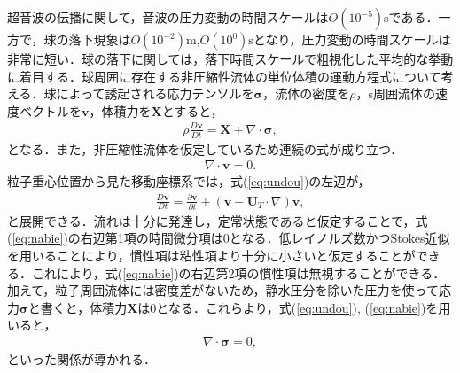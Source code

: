 超音波の伝播に関して，音波の圧力変動の時間スケールは$O\left(10^{-5}\right)$sである．一方で，球の落下現象は$O\left(10^{-2}\right)$m,$O\left(10^{0}\right)$sとなり，圧力変動の時間スケールは非常に短い．球の落下に関しては，落下時間スケールで粗視化した平均的な挙動に着目する．球周囲に存在する非圧縮性流体の単位体積の運動方程式について考える．球によって誘起される応力テンソルを$\bm{\sigma}$，流体の密度を$\rho$，s周囲流体の速度ベクトルを$\bm{v}$，体積力を$\bm{X}$とすると，
\begin{eqnarray}
    \rho \frac{D\bm{v}}{Dt} = \bm{X} + \nabla \cdot \bm{\sigma} ,
    \label{eq:undou}
\end{eqnarray}
となる．また，非圧縮性流体を仮定しているため連続の式が成り立つ．
\begin{eqnarray}
    \nabla \cdot \bm{v} = 0 .
    \label{eq:renzoku}
\end{eqnarray}
粒子重心位置から見た移動座標系では，式(\ref{eq:undou})の左辺が，
\begin{eqnarray}
    \frac{D\bm{v}}{Dt} = \frac{\partial \bm{v}}{\partial t} + \left(\bm{v} - \bm{U}_T \cdot \nabla \right) \bm{v} ,
    \label{eq:nabie}
\end{eqnarray}
と展開できる．流れは十分に発達し，定常状態であると仮定することで，式(\ref{eq:nabie})の右辺第1項の時間微分項は0となる．低レイノルズ数かつStokes近似を用いることにより，慣性項は粘性項より十分に小さいと仮定することができる．これにより，式(\ref{eq:nabie})の右辺第2項の慣性項は無視することができる．加えて，粒子周囲流体には密度差がないため，静水圧分を除いた圧力を使って応力${\bm \sigma}$と書くと，体積力${\bm X}$は0となる．これらより，式(\ref{eq:undou}), (\ref{eq:nabie})を用いると，
\begin{eqnarray}
    \nabla \cdot \bm{\sigma} = 0 ,
    \label{eq:sigma-}
\end{eqnarray}
といった関係が導かれる．

